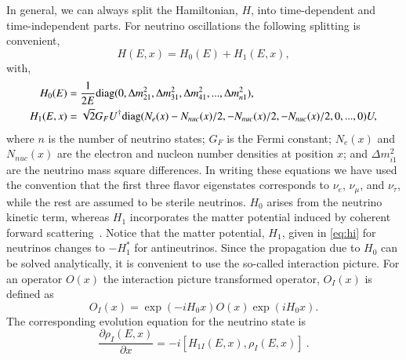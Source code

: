\documentclass[3p,12pt]{elsarticle}
\newcommand{\pa}[2]{\frac{\partial #1}{\partial #2}}
\begin{document}
In general, we can always split the Hamiltonian, $H$, into
time-dependent and time-independent parts. For neutrino oscillations
the following splitting is convenient,
\begin{equation}
H(E,x) = H_0(E)  + H_{1}(E,x) ,
\end{equation}
with,
\begin{subequations}
\label{eq:hamiltonian}
\begin{align}
H_0 (E) &= \frac{1}{2E} {\rm diag}( 0 , \Delta m^2_{21},\Delta m^2_{31},\Delta m^2_{41},...,\Delta m^2_{n1}) \label{eq:h0} ,\\
H_1 (E,x) &= \sqrt{2} G_F U^\dagger {\rm diag} ( N_e(x) -
N_{nuc}(x)/2, -N_{nuc}(x)/2, -N_{nuc}(x)/2 , 0,...,0 )U ,\label{eq:hi} 
\end{align}
\end{subequations}
where $n$ is the number of neutrino states; $G_F$ is the Fermi
constant; $N_e(x)$ and $N_{nuc}(x)$ are the electron and nucleon number
densities at position $x$; and $\Delta m^2_{i1}$ are the neutrino mass
square differences.
In writing these equations we have used the convention that the first
three flavor eigenstates corresponds to 
$\nu_e$, $\nu_\mu$, and $\nu_\tau$, while the rest are assumed to be
sterile neutrinos. $H_0$ arises from the neutrino kinetic
term, whereas $H_1$ incorporates the matter potential induced by coherent
forward scattering~\citep{Mikheev:1986gs,Mikheev:1986wj,Wolfenstein:1977ue}. Notice that the matter
potential, $H_1$, given in \eqref{eq:hi} for neutrinos changes to
$-H_1^*$ for antineutrinos. 
Since the propagation due to $H_0$ can be solved analytically, it is
convenient to use the  so-called interaction picture. For an operator
$O(x)$ the interaction picture transformed
operator, $O_I(x)$ is defined as
\begin{equation}
O_I(x)=\exp(-iH_0x)O(x)\exp(iH_0x).
\end{equation}
The corresponding evolution equation  for the neutrino state is
\begin{equation}
\pa{\rho_I(E,x)}{x} = -i [ H_{1I} (E,x), \rho_I(E,x) ]~.
\label{eq:schrodinger_int}
\end{equation}
\end{document}
